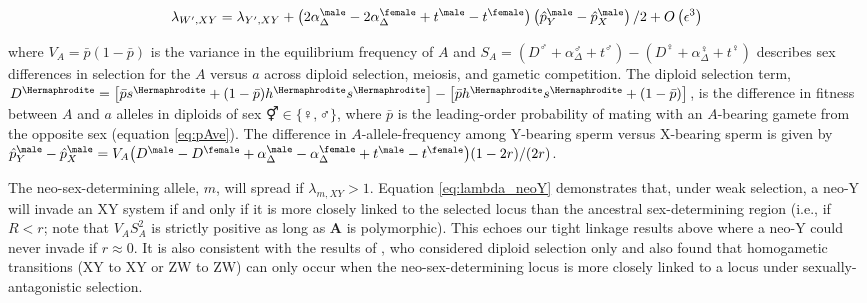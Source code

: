 \documentclass[12pt]{article}
\begin{document}
\begin{equation}
\lambda_{W',XY} =\lambda_{Y',XY}+\left(2\alpha_{\Delta}^\male-2\alpha_{\Delta}^\female+t^\male-t^\female \right) \left( \hat{p}^\male_Y-\hat{p}^\male_X \right)/2
+O\left(\epsilon^3 \right) \\
\label{eq:lambda_neoW}
\end{equation}

\noindent
where $V_{A}=\bar{p}(1-\bar{p})$ is the variance in the equilibrium frequency of $A$ and $S_{A}=(D^\male +\alpha_{\Delta}^\male+t^\male) - (D^\female+\alpha_{\Delta}^\female+t^\female)$ describes sex differences in selection for the $A$ versus $a$ across diploid selection, meiosis, and gametic competition.
The diploid selection term, $D^\Hermaphrodite=\big{[} \bar{p}s^\Hermaphrodite+(1-\bar{p})h^\Hermaphrodite s^\Hermaphrodite\big{]} -\big{[} \bar{p}h^\Hermaphrodite s^\Hermaphrodite+(1-\bar{p}) \big{]}$, is the difference in fitness between $A$ and $a$ alleles in diploids of sex $\Hermaphrodite \in \{\female,\male\}$, where $\bar{p}$ is the leading-order probability of mating with an $A$-bearing gamete from the opposite sex (equation \ref{eq:pAve}). 
The difference in $A$-allele-frequency among Y-bearing sperm versus X-bearing sperm is given by $\hat{p}^\male_Y-\hat{p}^\male_X=V_{A}\big{(}D^\male - D^\female+\alpha_{\Delta}^\male-\alpha_{\Delta}^\female+t^\male-t^\female\big{)}(1-2r)/(2r)$. 


The neo-sex-determining allele, $m$, will spread if $\lambda_{m,XY}>1$. 
Equation \eqref{eq:lambda_neoY} demonstrates that, under weak selection, a neo-Y will invade an XY system if and only if it is more closely linked to the selected locus than the ancestral sex-determining region (i.e., if $R<r$; note that $V_{A}S_{A}^2$ is strictly positive as long as \textbf{A} is polymorphic). 
This echoes our tight linkage results above where a neo-Y could never invade if $r\approx0$. It is also consistent with the results of \citet{vanDoorn:2007eu}, who considered diploid selection only and also found that homogametic transitions (XY to XY or ZW to ZW) can only occur when the neo-sex-determining locus is more closely linked to a locus under sexually-antagonistic selection. 
\end{document}

